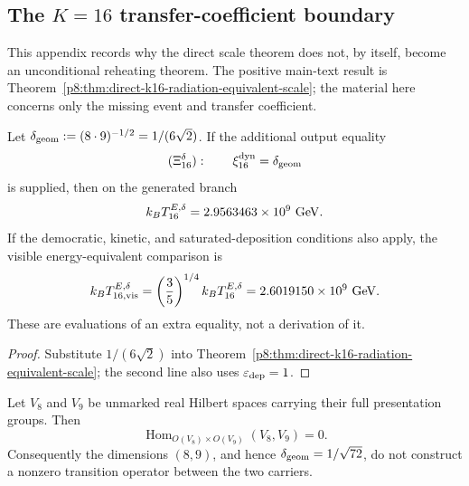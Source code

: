 \documentclass[12pt,a4paper]{article}
\begin{document}


\subsection{The \(K=16\) transfer-coefficient boundary}
\label{p8:app:k16-transfer-coefficient-no-go}

This appendix records why the direct scale theorem does not, by itself,
become an unconditional reheating theorem.  The positive main-text result is
Theorem~\ref{p8:thm:direct-k16-radiation-equivalent-scale}; the material
here concerns only the missing event and transfer coefficient.

\begin{corollary}
\label{paper6c:corollary:atlas-legacy-geometric-comparison-member-a65187d}%

Let \(\delta_{\rm geom}:=(8\cdot9)^{-1/2}=1/(6\sqrt2)\).  If the additional
output equality
\begin{equation}
\label{p8:eq:xi16-delta-conditional-member}
 (\Xi_{16}^{\delta}):\qquad
 \xi_{16}^{\rm dyn}=\delta_{\rm geom}
\end{equation}
is supplied, then on the generated branch
\begin{equation}
\label{p8:eq:direct-k16-delta-numerics}
 k_BT_{16}^{E,\delta}=2.9563463\times10^9\ {\rm GeV}.
\end{equation}
If the democratic, kinetic, and saturated-deposition conditions also apply,
the visible energy-equivalent comparison is
\begin{equation}
\label{p8:eq:direct-k16-delta-visible-numerics}
 k_BT_{16,{\rm vis}}^{E,\delta}
 =\left(\frac35\right)^{1/4}k_BT_{16}^{E,\delta}
 =2.6019150\times10^9\ {\rm GeV}.
\end{equation}
These are evaluations of an extra equality, not a derivation of it.
\end{corollary}

\begin{proof}
Substitute \(1/(6\sqrt2)\) into
Theorem~\ref{p8:thm:direct-k16-radiation-equivalent-scale}; the second
line also uses \(\varepsilon_{\rm dep}=1\).
\end{proof}

\begin{proposition}
\label{p8:prop:no-unmarked-eight-nine-transition-map}
Let \(V_8\) and \(V_9\) be unmarked real Hilbert spaces carrying their full
presentation groups.  Then
\[
 \operatorname{Hom}_{O(V_8)\times O(V_9)}(V_8,V_9)=0.
\]
Consequently the dimensions \((8,9)\), and hence
\(\delta_{\rm geom}=1/\sqrt{72}\), do not construct a nonzero transition
operator between the two carriers.
\end{proposition}
\end{document}
